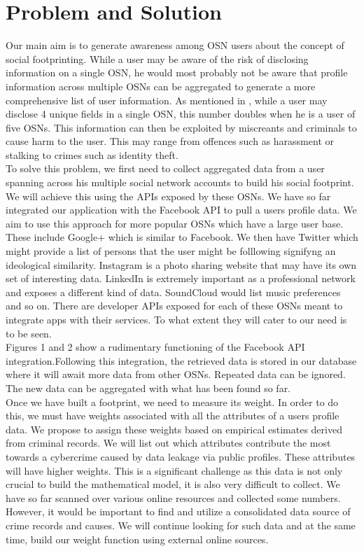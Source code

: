 \documentclass[12pt,conference]{IEEEtran}
\begin{document}
\section{Problem and Solution}
Our main aim is to generate awareness among OSN users about the concept of social footprinting. While a user may be aware of the risk of disclosing information on a single OSN, he would most probably not be aware that profile information across multiple OSNs can be aggregated to generate a more comprehensive list of user information. As mentioned in \cite{emergingthreat}, while a user may disclose 4 unique fields in a single OSN, this number doubles when he is a user of five OSNs. This information can then be exploited by miscreants and criminals to cause harm to the user. This may range from offences such as harassment or stalking to crimes such as identity theft. \\

To solve this problem, we first need to collect aggregated data from a user spanning across his multiple social network accounts to build his social footprint. We will achieve this using the APIs exposed by these OSNs. We have so far integrated our application with the Facebook API to pull a users profile data. We aim to use this approach for more popular OSNs which have a large user base. These include Google+ which is similar to Facebook. We then have Twitter which might provide a list of persons that the user might be folllowing signifyng an ideological similarity. Instagram is a photo sharing website that may have its own set of interesting data. LinkedIn is extremely important as a professional network and exposes a different kind of data. SoundCloud would list music preferences and so on. There are developer APIs exposed for each of these OSNs meant to integrate apps with their services. To what extent they will cater to our need is to be seen.\\

Figures 1 and 2 show a rudimentary functioning of the Facebook API integration.Following this integration, the retrieved data is stored in our database where it will await more data from other OSNs. Repeated data can be ignored. The new data can be aggregated with what has been found so far.\\

Once we have built a footprint, we need to measure its weight. In order to do this, we must have weights associated with all the attributes of a users profile data. We propose to assign these weights based on empirical estimates derived from criminal records. We will list out which attributes contribute the most towards a cybercrime caused by data leakage via public profiles. These attributes will have higher weights. This is a significant challenge as this data is not only crucial to build the mathematical model, it is also very difficult to collect. We have so far scanned over various online resources and collected some numbers. However, it would be important to find and utilize a consolidated data source of crime records and causes. We will continue looking for such data and at the same time, build our weight function using external online sources.\\
\end{document}
